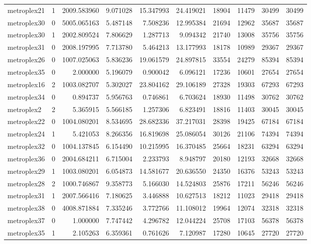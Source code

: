 \begin{longtable}{|l|r|r|r|r|r|r|r|r|r|}
metroplex21 & 1 & 2009.583960 & 9.071028 & 15.347993 & 24.419021 & 18904 & 11479 & 30499 & 30499 \\
metroplex30 & 0 & 5005.065163 & 5.487148 & 7.508236 & 12.995384 & 21694 & 12962 & 35687 & 35687 \\
metroplex30 & 1 & 2002.809524 & 7.806629 & 1.287713 & 9.094342 & 21740 & 13008 & 35756 & 35756 \\
metroplex31 & 0 & 2008.197995 & 7.713780 & 5.464213 & 13.177993 & 18178 & 10989 & 29367 & 29367 \\
metroplex26 & 0 & 1007.025063 & 5.836236 & 19.061579 & 24.897815 & 33554 & 24279 & 85394 & 85394 \\
metroplex35 & 0 & 2.000000 & 5.196079 & 0.900042 & 6.096121 & 17236 & 10601 & 27654 & 27654 \\
metroplex16 & 2 & 1003.082707 & 5.302027 & 23.804162 & 29.106189 & 27328 & 19303 & 67293 & 67293 \\
metroplex34 & 0 & 0.894737 & 5.956763 & 0.746861 & 6.703624 & 18930 & 11498 & 30762 & 30762 \\
metroplex2 & 2 & 5.365915 & 5.566185 & 1.257306 & 6.823491 & 18816 & 11403 & 30045 & 30045 \\
metroplex22 & 0 & 1004.080201 & 8.534695 & 28.682336 & 37.217031 & 28398 & 19425 & 67184 & 67184 \\
metroplex24 & 1 & 5.421053 & 8.266356 & 16.819698 & 25.086054 & 30126 & 21106 & 74394 & 74394 \\
metroplex32 & 0 & 1004.137845 & 6.154490 & 10.215995 & 16.370485 & 25664 & 18231 & 63294 & 63294 \\
metroplex36 & 0 & 2004.684211 & 6.715004 & 2.233793 & 8.948797 & 20180 & 12193 & 32668 & 32668 \\
metroplex29 & 1 & 1003.080201 & 6.054873 & 14.581677 & 20.636550 & 24350 & 16376 & 53243 & 53243 \\
metroplex28 & 2 & 1000.746867 & 9.358773 & 5.166030 & 14.524803 & 25876 & 17211 & 56246 & 56246 \\
metroplex31 & 1 & 2007.566416 & 7.180625 & 3.446888 & 10.627513 & 18212 & 11023 & 29418 & 29418 \\
metroplex38 & 0 & 4008.871884 & 7.335246 & 3.772766 & 11.108012 & 19964 & 12074 & 32318 & 32318 \\
metroplex37 & 0 & 1.000000 & 7.747442 & 4.296782 & 12.044224 & 25708 & 17103 & 56378 & 56378 \\
metroplex35 & 1 & 2.105263 & 6.359361 & 0.761626 & 7.120987 & 17280 & 10645 & 27720 & 27720 \\

\end{longtable}
